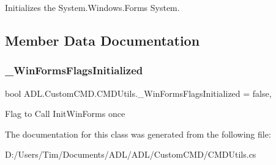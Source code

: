 Initializes the System.\+Windows.\+Forms System. 



\subsection{Member Data Documentation}
\mbox{\label{class_a_d_l_1_1_custom_c_m_d_1_1_c_m_d_utils_a146849b04a89ae31e86ae3fe959e98f5}} 
\subsubsection{\texorpdfstring{\+\_\+\+Win\+Forms\+Flags\+Initialized}{\_WinFormsFlagsInitialized}}
{\footnotesize\ttfamily bool A\+D\+L.\+Custom\+C\+M\+D.\+C\+M\+D\+Utils.\+\_\+\+Win\+Forms\+Flags\+Initialized = false\hspace{0.3cm}{\ttfamily [static]}, {\ttfamily [private]}}



Flag to Call Init\+Win\+Forms once 



The documentation for this class was generated from the following file\+:\begin{DoxyCompactItemize}
\item 
D\+:/\+Users/\+Tim/\+Documents/\+A\+D\+L/\+A\+D\+L/\+Custom\+C\+M\+D/C\+M\+D\+Utils.\+cs\end{DoxyCompactItemize}
